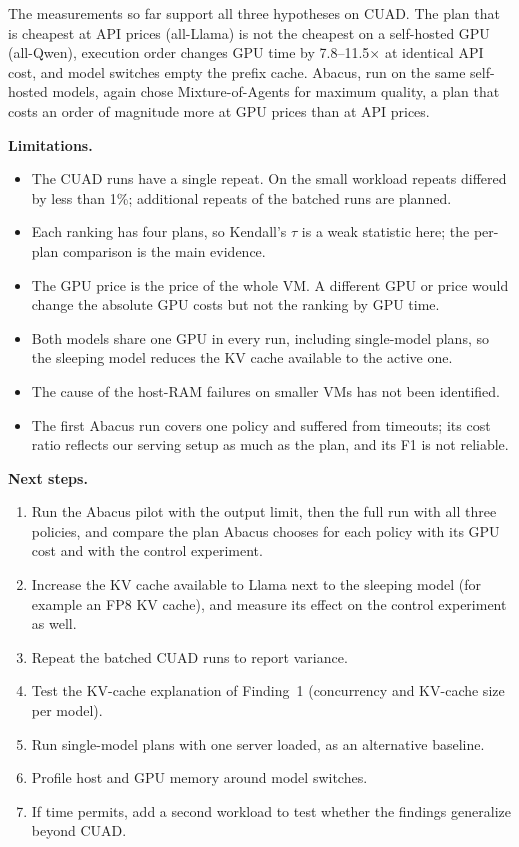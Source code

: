 \documentclass[a4paper,12pt]{report}
\begin{document}
The measurements so far support all three hypotheses on CUAD. The plan that is cheapest at API prices
(all-Llama) is not the cheapest on a self-hosted GPU (all-Qwen), execution order changes GPU time by
7.8--11.5$\times$ at identical API cost, and model switches empty the prefix cache. Abacus, run on the
same self-hosted models, again chose Mixture-of-Agents for maximum quality, a plan that costs an order
of magnitude more at GPU prices than at API prices.

\textbf{Limitations.}
\begin{itemize}
\item The CUAD runs have a single repeat. On the small workload repeats differed by less than 1\%;
additional repeats of the batched runs are planned.
\item Each ranking has four plans, so Kendall's $\tau$ is a weak statistic here; the per-plan
comparison is the main evidence.
\item The GPU price is the price of the whole VM. A different GPU or price would change the absolute
GPU costs but not the ranking by GPU time.
\item Both models share one GPU in every run, including single-model plans, so the sleeping model
reduces the KV cache available to the active one.
\item The cause of the host-RAM failures on smaller VMs has not been identified.
\item The first Abacus run covers one policy and suffered from timeouts; its cost ratio reflects our
serving setup as much as the plan, and its F1 is not reliable.
\end{itemize}

\textbf{Next steps.}
\begin{enumerate}
\item Run the Abacus pilot with the output limit, then the full run with all three policies, and
compare the plan Abacus chooses for each policy with its GPU cost and with the control experiment.
\item Increase the KV cache available to Llama next to the sleeping model (for example an FP8 KV
cache), and measure its effect on the control experiment as well.
\item Repeat the batched CUAD runs to report variance.
\item Test the KV-cache explanation of Finding~1 (concurrency and KV-cache size per model).
\item Run single-model plans with one server loaded, as an alternative baseline.
\item Profile host and GPU memory around model switches.
\item If time permits, add a second workload to test whether the findings generalize beyond CUAD.
\end{enumerate}



\end{document}
